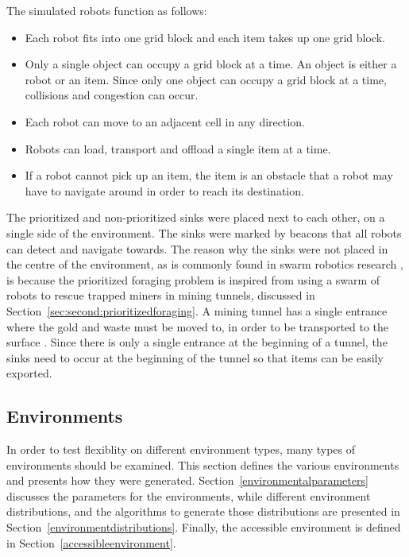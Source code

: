 \documentclass[preprint,12pt]{elsarticle}
\begin{document}
The simulated robots function as follows:
\begin{itemize}
	\item Each robot fits into one grid block and each item takes up one grid block. 
	\item Only a single object can occupy a grid block at a time.  An object is either a robot or an item. Since only one object can occupy a grid block at a time, collisions and congestion can occur.
	\item Each robot can move to an adjacent cell in any direction.
	\item Robots can load, transport and offload a single item at a time.
	\item If a robot cannot pick up an item, the item is an obstacle that a robot may have to navigate around in order to reach its destination.
\end{itemize}

The prioritized and non-prioritized sinks were placed next to each other, on a single side of the environment. The sinks were marked by beacons that all robots can detect and navigate towards. The reason why the sinks were not placed in the centre of the environment, as is commonly found in swarm robotics research \cite{labella2006division}, is because the prioritized foraging problem is inspired from using a swarm of robots to rescue trapped miners in mining tunnels, discussed in Section~\ref{sec:second:prioritizedforaging}. A mining tunnel has a single entrance where the gold and waste must be moved to, in order to be transported to the surface \cite{brune2010extracting}. Since there is only a single entrance at the beginning of a tunnel, the sinks need to occur at the beginning of the tunnel so that items can be easily exported.

\subsection{Environments}
\label{experimentenvironments}

In order to test flexiblity on different environment types, many types of environments should be examined. This section defines the various environments and presents how they were generated. Section~\ref{environmentalparameters} discusses the parameters for the environments, while different environment distributions, and the algorithms to generate those distributions are presented in Section~\ref{environmentdistributions}. Finally, the accessible environment is defined in Section~\ref{accessibleenvironment}.
\end{document}

